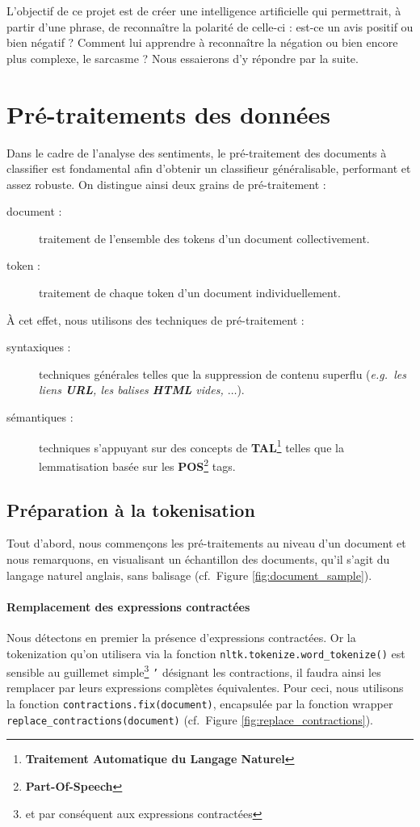 \documentclass[12pt,a4paper]{report}
\theoremstyle{definition}
\begin{document}
L'objectif de ce projet est de créer une intelligence artificielle qui permettrait, à partir d'une phrase, de reconnaître la polarité de celle-ci : est-ce un avis positif ou bien négatif ? Comment lui apprendre à reconnaître la négation ou bien encore plus complexe, le sarcasme ? Nous essaierons d'y répondre par la suite.

\chapter{Pré-traitements des données}
Dans le cadre de l'analyse des sentiments, le pré-traitement des documents à classifier est fondamental afin d'obtenir un classifieur généralisable, performant et assez robuste. On distingue ainsi deux grains de pré-traitement :
\begin{description}
  \item [document :] traitement de l'ensemble des tokens d'un document collectivement.
  \item [token :] traitement de chaque token d'un document individuellement.
\end{description}

À cet effet, nous utilisons des techniques de pré-traitement :
\begin{description}
  \item [syntaxiques :] techniques générales telles que la suppression de contenu superflu (\emph{e.g.~les liens \textbf{URL}, les balises \textbf{HTML} vides, $\dots$}).
  \item [sémantiques :] techniques s'appuyant sur des concepts de \textbf{TAL}\footnote{\textbf{Traitement Automatique du Langage Naturel}} telles que la lemmatisation basée sur les \textbf{POS}\footnote{\textbf{Part-Of-Speech}} tags.
\end{description}

\section{Préparation à la tokenisation}
Tout d'abord, nous commençons les pré-traitements au niveau d'un document et nous remarquons, en visualisant un échantillon des documents, qu'il s'agit du langage naturel anglais, sans balisage (cf.~Figure \ref{fig:document_sample}).

\subsubsection{Remplacement des expressions contractées}
Nous détectons en premier la présence d'expressions contractées. Or la tokenization qu'on utilisera via la fonction \texttt{nltk.tokenize.word\_tokenize()} est sensible au guillemet simple\footnote{et par conséquent aux expressions contractées} \og \texttt{'} \fg désignant les contractions, il faudra ainsi les remplacer par leurs expressions complètes équivalentes. Pour ceci, nous utilisons la fonction \texttt{contractions.fix(document)}, encapsulée par la fonction wrapper \texttt{replace\_contractions(document)} (cf.~Figure \ref{fig:replace_contractions}).
\end{document}
